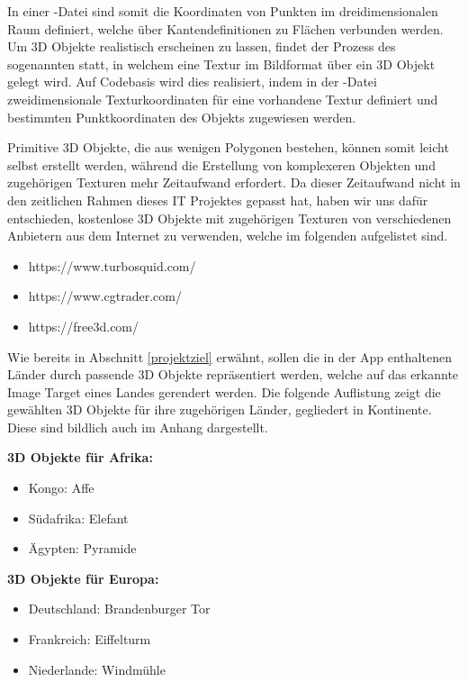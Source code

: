 In einer  -Datei sind somit die Koordinaten von Punkten im dreidimensionalen Raum definiert, welche über Kantendefinitionen zu Flächen verbunden werden. 
Um 3D Objekte realistisch erscheinen zu lassen, findet der Prozess des sogenannten  statt, in welchem eine Textur im Bildformat über ein 3D Objekt gelegt wird. 
Auf Codebasis wird dies realisiert, indem in der -Datei zweidimensionale Texturkoordinaten für eine vorhandene Textur definiert und bestimmten Punktkoordinaten des Objekts zugewiesen werden.

Primitive 3D Objekte, die aus wenigen Polygonen bestehen, können somit leicht selbst erstellt werden, während die Erstellung von komplexeren Objekten und zugehörigen Texturen mehr Zeitaufwand erfordert. 
Da dieser Zeitaufwand nicht in den zeitlichen Rahmen dieses IT Projektes gepasst hat, haben wir uns dafür entschieden, kostenlose 3D Objekte mit zugehörigen Texturen von verschiedenen Anbietern aus dem Internet zu verwenden, welche im folgenden aufgelistet sind.

\begin{itemize}
\item https://www.turbosquid.com/
\item https://www.cgtrader.com/
\item https://free3d.com/
\end{itemize}

Wie bereits in Abschnitt \ref{projektziel} erwähnt, sollen die in der App enthaltenen Länder durch passende 3D Objekte repräsentiert werden, welche auf das erkannte Image Target eines Landes gerendert werden. 
Die folgende Auflistung zeigt die gewählten 3D Objekte für ihre zugehörigen Länder, gegliedert in Kontinente. Diese sind bildlich auch im Anhang dargestellt.

\textbf{3D Objekte für Afrika:}
\begin{itemize}
\item Kongo: Affe
\item Südafrika: Elefant
\item Ägypten: Pyramide
\end{itemize}

\textbf{3D Objekte für Europa:}
\begin{itemize}
\item Deutschland: Brandenburger Tor	
\item Frankreich: Eiffelturm
\item Niederlande: Windmühle
\end{itemize}

